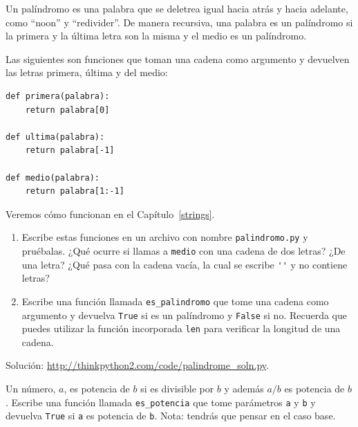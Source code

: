 \documentclass[10pt]{book}
\begin{document}
\begin{exercise}
\label{palindrome}

Un palíndromo es una palabra que se deletrea igual hacia atrás y
hacia adelante, como ``noon'' y ``redivider''.  De manera recursiva, una palabra
es un palíndromo si la primera y la última letra son la misma
y el medio es un palíndromo.

Las siguientes son funciones que toman una cadena como argumento y
devuelven las letras primera, última y del medio:

\begin{verbatim}
def primera(palabra):
    return palabra[0]

def ultima(palabra):
    return palabra[-1]

def medio(palabra):
    return palabra[1:-1]
\end{verbatim}
%
Veremos cómo funcionan en el Capítulo~\ref{strings}.

\begin{enumerate}

\item Escribe estas funciones en un archivo con nombre {\tt palindromo.py}
y pruébalas.  ¿Qué ocurre si llamas a {\tt medio} con
una cadena de dos letras?  ¿De una letra?  ¿Qué pasa con la cadena
vacía, la cual se escribe \verb"''" y no contiene letras?

\item Escribe una función llamada \verb"es_palindromo" que tome
una cadena como argumento y devuelva {\tt True} si es un palíndromo
y {\tt False} si no.  Recuerda que puedes utilizar la
función incorporada {\tt len} para verificar la longitud de una cadena.

\end{enumerate}

Solución: \url{http://thinkpython2.com/code/palindrome_soln.py}.

\end{exercise}

\begin{exercise}

Un número, $a$, es potencia de $b$ si es divisible por $b$
y además $a/b$ es potencia de $b$.  Escribe una función llamada
\verb"es_potencia" que tome parámetros {\tt a} y {\tt b}
y devuelva {\tt True} si {\tt a} es potencia de {\tt b}.
Nota: tendrás que pensar en el caso base.

\end{exercise}
\end{document}
